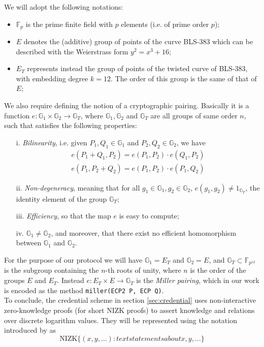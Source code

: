 \documentclass[twocolumn]{article}
\begin{document}
We will adopt the following notations:
\begin{itemize}
    \item $\mathbb{F}_p$ is the prime finite field with $p$ elements (i.e. of prime order $p$); %
    \item $E$ denotes the (additive) group of points of the curve BLS-383 \citep{bls383} which can be described with the Weierstrass form  $y^2=x^3 + 16$; 
    \item $E_T$ represents instead the group of points of the twisted curve of BLS-383, with embedding degree $k=12$. The order of this group is the same of that of $E$;
\end{itemize}
We also require defining the notion of a cryptographic pairing. Basically it is a function $e: \mathbb{G}_1\times\mathbb{G}_2\to \mathbb{G}_T$, where $\mathbb{G}_1,\mathbb{G}_2$ and $\mathbb{G}_T$ are all groups of same order $n$, such that satisfies the following properties:
\begin{itemize}
    \item [i.] \emph{Bilinearity}, i.e. given $P_1,Q_1\in\mathbb{G}_1$ and $P_2,Q_2\in\mathbb{G}_2$, we have 
    \begin{align*}
        e(P_1+Q_1,P_2) = e(P_1,P_2)\cdot e(Q_1,P_2) \\
        e(P_1,P_2+Q_2) = e(P_1,P_2)\cdot e(P_1,Q_2)
    \end{align*}
    \item[ii.] \emph{Non-degeneracy}, meaning that for all $g_1\in\mathbb{G}_1, g_2\in\mathbb{G}_2$, $e(g_1,g_2)\ne 1_{\mathbb{G}_T}$, the identity element of the group $\mathbb{G}_T$;
    \item[iii.] \emph{ Efficiency}, so that the map $e$ is easy to compute;
    \item[iv. ] $\mathbb{G}_1\ne \mathbb{G}_2$, and moreover, that there exist no efficient homomorphism between $\mathbb{G}_1$ and $\mathbb{G}_2$.
\end{itemize}
For the purpose of our protocol we will have $\mathbb{G}_1 = E_T$ and $\mathbb{G}_2 = E$, and $\mathbb{G}_T\subset \mathbb{F}_{p^{12}}$ is the subgroup containing the $n$-th roots of unity, where $n$ is the order of the groups $E$ and $E_T$. Instead $e: E_T  \times E\to \mathbb{G}_T$ is the \emph{Miller pairing}, which in our work is encoded as the method \verb!miller(ECP2 P, ECP Q)!. \\
To conclude, the credential scheme in section \ref{sec:credential} uses non-interactive zero-knowledge proofs (for short NIZK proofs) to assert knowledge and relations over discrete logarithm values. They will be represented using the notation introduced by \cite{camenisch} as 
\[
\text{NIZK}\{(x,y,\dots): text{statements about x, y,}\dots \}
\]
\pagebreak
\end{document}
